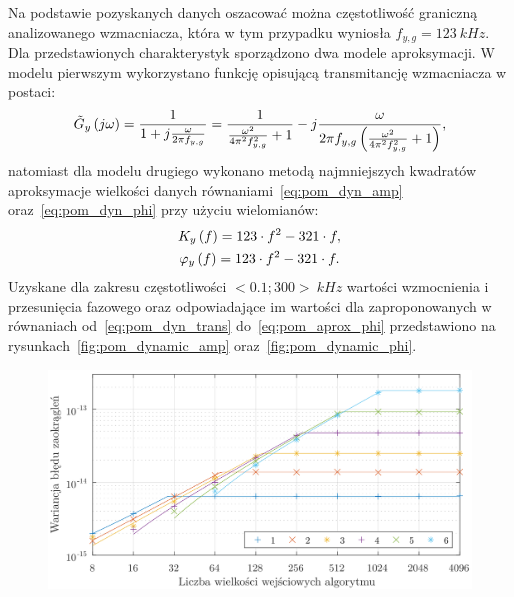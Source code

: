 Na podstawie pozyskanych danych oszacować można częstotliwość graniczną analizowanego wzmacniacza, która w tym przypadku wyniosła $f_{y,g} = \qty{123}{kHz}$. Dla przedstawionych charakterystyk sporządzono dwa modele aproksymacji. W modelu pierwszym wykorzystano funkcję opisującą transmitancję wzmacniacza w postaci:
\begin{gather}
\tilde{G}_{y} \left(j\omega\right) = \frac{1}{1 + j \frac{\omega}{2 \pi f_{y,g}}} = \frac{1}{\frac{\omega^{2}}{4 \pi^{2} f_{y,g}^{2}} + 1} - j \frac{\omega}{2 \pi f_{y,g} \left( \frac{\omega^{2}}{4 \pi^{2} f_{y,g}^{2}} + 1 \right) } \label{eq:pom_dyn_trans},
\end{gather}
natomiast dla modelu drugiego wykonano metodą najmniejszych kwadratów aproksymacje wielkości danych równaniami~\eqref{eq:pom_dyn_amp} oraz~\eqref{eq:pom_dyn_phi} przy użyciu wielomianów:
\begin{gather}
K_{y} \left(f\right) = 123 \cdot f^{2} - 321 \cdot f \label{eq:pom_aprox_amp}, \\
\varphi_{y} \left(f\right) = 123 \cdot f^{2} - 321 \cdot f \label{eq:pom_aprox_phi}.
\end{gather}
Uzyskane dla zakresu częstotliwości $<0.1;300>~\unit{kHz}$ wartości wzmocnienia i przesunięcia fazowego oraz odpowiadające im wartości dla zaproponowanych w równaniach od~\eqref{eq:pom_dyn_trans} do~\eqref{eq:pom_aprox_phi} przedstawiono na rysunkach~\ref{fig:pom_dynamic_amp} oraz~\ref{fig:pom_dynamic_phi}.

\begin{figure}[htb!]
\begin{center}
\includegraphics{obrazki/dwt_rerror_coif5}
\end{center}
\end{figure}

